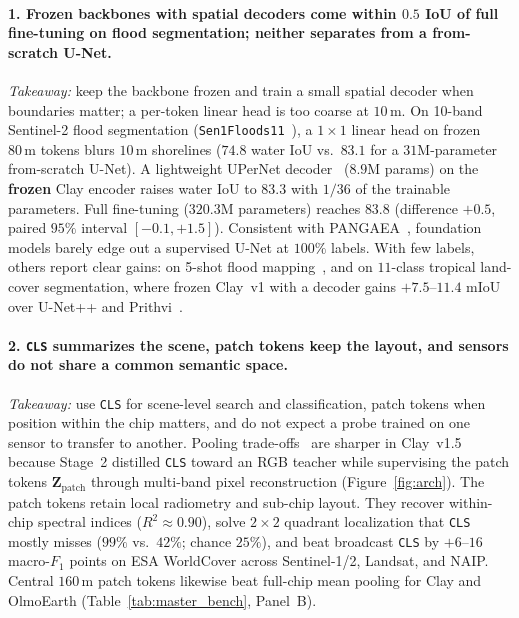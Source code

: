 \paragraph{1. Frozen backbones with spatial decoders come within $0.5$ IoU of full fine-tuning on flood segmentation; neither separates from a from-scratch U-Net.}
\emph{Takeaway:} keep the backbone frozen and train a small spatial decoder when boundaries matter; a per-token linear head is too coarse at $10\,\text{m}$. \label{sec:lesson_finetune}
On 10-band Sentinel-2 flood segmentation (\texttt{Sen1Floods11}~\cite{bonafilia2020sen1floods11}), a $1\times 1$ linear head on frozen $80\,\text{m}$ tokens blurs $10\,\text{m}$ shorelines ($74.8$ water IoU vs.\ $83.1$ for a $31\text{M}$-parameter from-scratch U-Net). A lightweight UPerNet decoder~\cite{xiao2018upernet} ($8.9\text{M}$ params) on the \textbf{frozen} Clay encoder raises water IoU to $83.3$ with $1/36$ of the trainable parameters. Full fine-tuning ($320.3\text{M}$ parameters) reaches $83.8$ (difference $+0.5$, paired $95\%$ interval $[-0.1, +1.5]$). Consistent with PANGAEA~\cite{marsocci2026pangaea}, foundation models barely edge out a supervised U-Net at $100\%$ labels. With few labels, others report clear gains: on 5-shot flood mapping~\cite{kaushik2026flood}, and on $11$-class tropical land-cover segmentation, where frozen Clay~v1 with a decoder gains $+7.5\text{--}11.4$ mIoU over U-Net++ and Prithvi~\cite{wiratama2025indonesia}.

\paragraph{2. \texttt{CLS} summarizes the scene, patch tokens keep the layout, and sensors do not share a common semantic space.}
\emph{Takeaway:} use \texttt{CLS} for scene-level search and classification, patch tokens when position within the chip matters, and do not expect a probe trained on one sensor to transfer to another. \label{sec:lesson_tokens}
Pooling trade-offs~\cite{corley2026pooling} are sharper in Clay~v1.5 because Stage~2 distilled \texttt{CLS} toward an RGB teacher while supervising the patch tokens $\bm{Z}_{\mathrm{patch}}$ through multi-band pixel reconstruction (Figure~\ref{fig:arch}). The patch tokens retain local radiometry and sub-chip layout. They recover within-chip spectral indices ($R^2 \approx 0.90$), solve $2\times 2$ quadrant localization that \texttt{CLS} mostly misses ($99\%$ vs.\ $42\%$; chance $25\%$), and beat broadcast \texttt{CLS} by $+6\text{--}16$ macro-$F_1$ points on ESA WorldCover across Sentinel-1/2, Landsat, and NAIP. Central $160\,\text{m}$ patch tokens likewise beat full-chip mean pooling for Clay and OlmoEarth (Table~\ref{tab:master_bench}, Panel~B).

